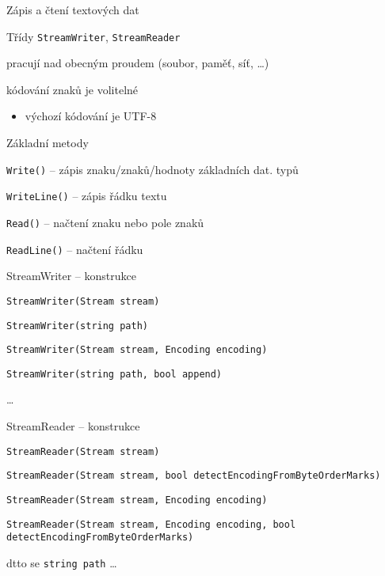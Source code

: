 

\begin{frame}[fragile]
\vfill
\begin{bitemize}{Zápis a čtení textových dat}
\item Třídy \lstinline|StreamWriter|, \lstinline|StreamReader|
\item pracují nad obecným proudem (soubor, paměť, síť, \ldots)
\item kódování znaků je volitelné
\begin{itemize}
\item výchozí kódování je UTF-8
\end{itemize}
\end{bitemize}
\vfill
\begin{bitemize}{Základní metody}
\item \lstinline|Write()| -- zápis znaku/znaků/hodnoty základních dat. typů
\item \lstinline|WriteLine()| -- zápis řádku textu
\item \lstinline|Read()| -- načtení znaku nebo pole znaků
\item \lstinline|ReadLine()| -- načtení řádku
\end{bitemize}
\vfill
\end{frame}




\begin{frame}[fragile]
\vfill
\begin{bitemize}{StreamWriter -- konstrukce}
\item \lstinline|StreamWriter(Stream stream)|
\item \lstinline|StreamWriter(string path)|
\item \lstinline|StreamWriter(Stream stream, Encoding encoding)|
\item \lstinline|StreamWriter(string path, bool append)|
\item \ldots
\end{bitemize}
\vfill
\begin{bitemize}{StreamReader -- konstrukce}
\item \lstinline|StreamReader(Stream stream)|
\item \lstinline|StreamReader(Stream stream, bool detectEncodingFromByteOrderMarks)|
\item \lstinline|StreamReader(Stream stream, Encoding encoding)|
\item \lstinline|StreamReader(Stream stream, Encoding encoding, bool detectEncodingFromByteOrderMarks)|
\item dtto se \lstinline|string path| \ldots
\end{bitemize}
\vfill
\end{frame}



